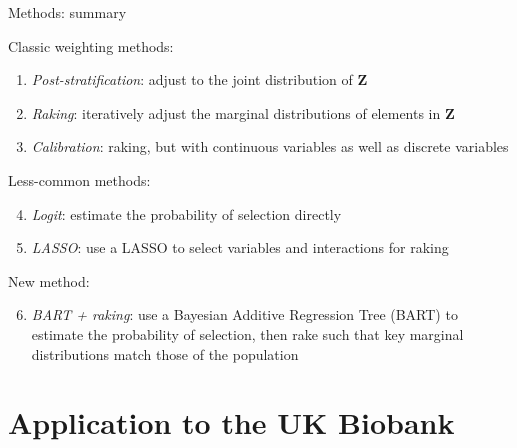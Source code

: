 \documentclass[
  ignorenonframetext,
]{beamer}
\providecommand{\tightlist}{%
  \setlength{\itemsep}{0pt}\setlength{\parskip}{0pt}}
\begin{document}
\begin{frame}{Methods: summary}
\protect\hypertarget{methods-summary}{}

Classic weighting methods:

\begin{enumerate}
\tightlist
\item
  \emph{Post-stratification}: adjust to the joint distribution of
  \(\mathbf{Z}\)
\item
  \emph{Raking}: iteratively adjust the marginal distributions of
  elements in \(\mathbf{Z}\)
\item
  \emph{Calibration}: raking, but with continuous variables as well as
  discrete variables
\end{enumerate}

Less-common methods:

\begin{enumerate}
\setcounter{enumi}{3}
\tightlist
\item
  \emph{Logit}: estimate the probability of selection directly
\item
  \emph{LASSO}: use a LASSO to select variables and interactions for
  raking
\end{enumerate}

New method:

\begin{enumerate}
\setcounter{enumi}{5}
\tightlist
\item
  \emph{BART + raking}: use a Bayesian Additive Regression Tree (BART)
  to estimate the probability of selection, then rake such that key
  marginal distributions match those of the population
\end{enumerate}

\end{frame}

\hypertarget{application-to-the-uk-biobank}{%
\section{Application to the UK
Biobank}\label{application-to-the-uk-biobank}}
\end{document}
